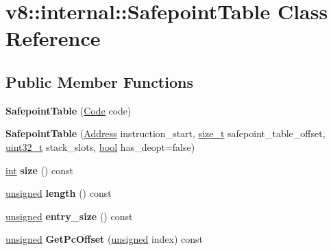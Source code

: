 \hypertarget{classv8_1_1internal_1_1SafepointTable}{}\section{v8\+:\+:internal\+:\+:Safepoint\+Table Class Reference}
\label{classv8_1_1internal_1_1SafepointTable}
\subsection*{Public Member Functions}
\begin{DoxyCompactItemize}
\item 
\mbox{\label{classv8_1_1internal_1_1SafepointTable_aa9868d8caf1591467419b2937b2fc567}} 
{\bfseries Safepoint\+Table} (\mbox{\hyperlink{classv8_1_1internal_1_1Code}{Code}} code)
\item 
\mbox{\label{classv8_1_1internal_1_1SafepointTable_ad6d93b5b6ab031ace0ebba61afc2e4fe}} 
{\bfseries Safepoint\+Table} (\mbox{\hyperlink{classuintptr__t}{Address}} instruction\+\_\+start, \mbox{\hyperlink{classsize__t}{size\+\_\+t}} safepoint\+\_\+table\+\_\+offset, \mbox{\hyperlink{classuint32__t}{uint32\+\_\+t}} stack\+\_\+slots, \mbox{\hyperlink{classbool}{bool}} has\+\_\+deopt=false)
\item 
\mbox{\label{classv8_1_1internal_1_1SafepointTable_a9e9de97ebcb8971210de78f74f812559}} 
\mbox{\hyperlink{classint}{int}} {\bfseries size} () const
\item 
\mbox{\label{classv8_1_1internal_1_1SafepointTable_aa992e87d483dcff4ec4849304773af80}} 
\mbox{\hyperlink{classunsigned}{unsigned}} {\bfseries length} () const
\item 
\mbox{\label{classv8_1_1internal_1_1SafepointTable_a17b84048823235ba67f37207eca22e0c}} 
\mbox{\hyperlink{classunsigned}{unsigned}} {\bfseries entry\+\_\+size} () const
\item 
\mbox{\label{classv8_1_1internal_1_1SafepointTable_a551b751ede24780ecfe0b42f6f4abe0d}} 
\mbox{\hyperlink{classunsigned}{unsigned}} {\bfseries Get\+Pc\+Offset} (\mbox{\hyperlink{classunsigned}{unsigned}} index) const

\end{DoxyCompactItemize}
